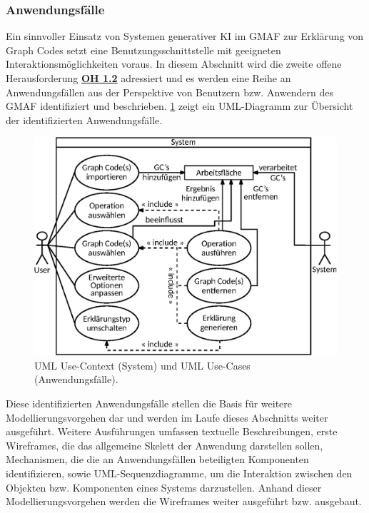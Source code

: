 \subsubsection{Anwendungsfälle}
\label{sec3:model:subsubsec:use-cases}
Ein sinnvoller Einsatz von Systemen generativer KI im GMAF zur Erklärung von Graph Codes setzt eine Benutzungsschnittstelle mit geeigneten Interaktionsmöglichkeiten voraus.
In diesem Abschnitt wird die zweite offene Herausforderung \hyperref[sec2:sota:oi:1.2]{\textbf{OH 1.2}} adressiert und es werden eine Reihe an Anwendungsfällen aus der Perspektive von Benutzern bzw. Anwendern des GMAF identifiziert und beschrieben.
\cref{sec3:model:subsubsec:use-cases:fig:overview-use-cases} zeigt ein UML-Diagramm zur Übersicht der identifizierten Anwendungsfälle.
\begin{figure}[htb]
    \centering
    \includegraphics[width=\textwidth]{chapter/chapter_3/uml-explainer-system.eps}
    \caption{UML Use-Context (System) und UML Use-Cases (Anwendungsfälle).}
    \label{sec3:model:subsubsec:use-cases:fig:overview-use-cases}
\end{figure}
\noindent
Diese identifizierten Anwendungsfälle stellen die Basis für weitere Modellierungsvorgehen dar und werden im Laufe dieses Abschnitts weiter ausgeführt.
Weitere Ausführungen umfassen textuelle Beschreibungen, erste Wireframes, die das allgemeine Skelett der Anwendung darstellen sollen, Mechanismen, die die an Anwendungsfällen beteiligten Komponenten identifizieren, sowie UML-Sequenzdiagramme, um die Interaktion zwischen den Objekten bzw. Komponenten eines Systems darzustellen.
Anhand dieser Modellierungsvorgehen werden die Wireframes weiter ausgeführt bzw. ausgebaut.

